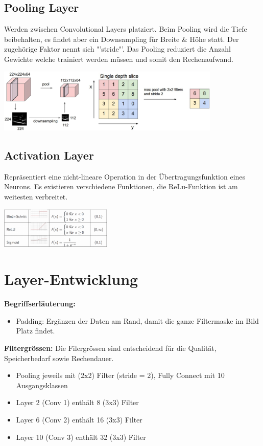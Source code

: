 \subsection{Pooling Layer}
Werden zwischen Convolutional Layers platziert. Beim Pooling wird die Tiefe beibehalten, 
es findet aber ein Downsampling für Breite \& Höhe statt. Der zugehörige Faktor nennt 
sich "'stride"'. Das Pooling reduziert die Anzahl Gewichte welche trainiert werden müssen 
und somit den Rechenaufwand. 
\begin{center}
		\includegraphics[width=0.8\textwidth]{../fig/pooling_layer}
\end{center}
\subsection{Activation Layer}
Repräsentiert eine nicht-lineare Operation in der Übertragungsfunktion eines Neurons. 
Es existieren verschiedene Funktionen, die ReLu-Funktion ist am weitesten verbreitet. 
\begin{center}
		\includegraphics[width=0.40\textwidth]{../fig/activation_layer}
\end{center}

\section{Layer-Entwicklung}
\textbf{Begriffserläuterung:}
\begin{itemize}[noitemsep,topsep=3pt]
	\item Padding: Ergänzen der Daten am Rand, damit die ganze Filtermaske im Bild Platz findet.
\end{itemize}
\textbf{Filtergrössen:}
Die Filergrössen sind entscheidend für die Qualität, Speicherbedarf sowie Rechendauer.
\begin{itemize}[noitemsep,topsep=3pt]
	\item Pooling jeweils mit (2x2) Filter (stride = 2), Fully Connect mit 10 Ausgangsklassen
	\item Layer 2 (Conv 1) enthält 8 (3x3) Filter
	\item Layer 6 (Conv 2) enthält 16 (3x3) Filter
	\item Layer 10 (Conv 3) enthält 32 (3x3) Filter
\end{itemize}

